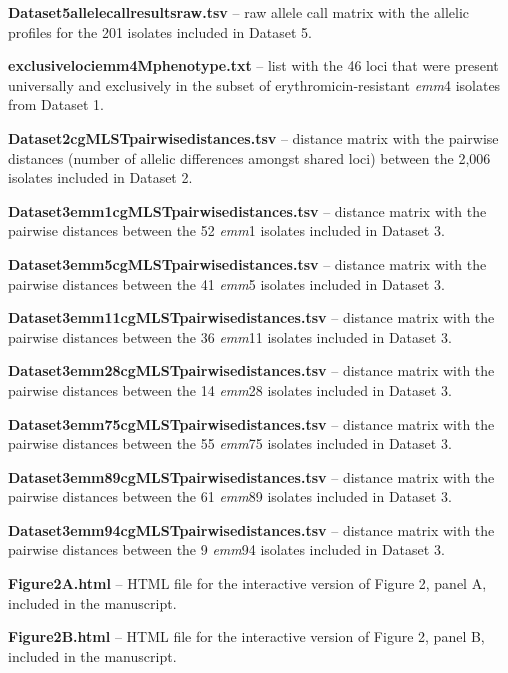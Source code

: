\noindent \textbf{Dataset5\textunderscore allelecall\textunderscore results\textunderscore raw.tsv} – raw allele call matrix with the allelic profiles for the 201 isolates included in Dataset 5.

\noindent \textbf{exclusive\textunderscore loci\textunderscore emm4\textunderscore Mphenotype.txt} – list with the 46 loci that were present universally and exclusively in the subset of erythromicin-resistant \textit{emm}4 isolates from Dataset 1.

\noindent \textbf{Dataset2\textunderscore cgMLST\textunderscore pairwise\textunderscore distances.tsv} – distance matrix with the pairwise distances (number of allelic differences amongst shared loci) between the 2,006 isolates included in Dataset 2.

\noindent \textbf{Dataset3\textunderscore emm1\textunderscore cgMLST\textunderscore pairwise\textunderscore distances.tsv} – distance matrix with the pairwise distances between the 52 \textit{emm}1 isolates included in Dataset 3.

\noindent \textbf{Dataset3\textunderscore emm5\textunderscore cgMLST\textunderscore pairwise\textunderscore distances.tsv} – distance matrix with the pairwise distances between the 41 \textit{emm}5 isolates included in Dataset 3.

\noindent \textbf{Dataset3\textunderscore emm11\textunderscore cgMLST\textunderscore pairwise\textunderscore distances.tsv} – distance matrix with the pairwise distances between the 36 \textit{emm}11 isolates included in Dataset 3.

\noindent \textbf{Dataset3\textunderscore emm28\textunderscore cgMLST\textunderscore pairwise\textunderscore distances.tsv} – distance matrix with the pairwise distances between the 14 \textit{emm}28 isolates included in Dataset 3.

\noindent \textbf{Dataset3\textunderscore emm75\textunderscore cgMLST\textunderscore pairwise\textunderscore distances.tsv} – distance matrix with the pairwise distances between the 55 \textit{emm}75 isolates included in Dataset 3.

\noindent \textbf{Dataset3\textunderscore emm89\textunderscore cgMLST\textunderscore pairwise\textunderscore distances.tsv} – distance matrix with the pairwise distances between the 61 \textit{emm}89 isolates included in Dataset 3.

\noindent \textbf{Dataset3\textunderscore emm94\textunderscore cgMLST\textunderscore pairwise\textunderscore distances.tsv} – distance matrix with the pairwise distances between the 9 \textit{emm}94 isolates included in Dataset 3.

\noindent \textbf{Figure2A.html} – HTML file for the interactive version of Figure 2, panel A, included in the manuscript.

\noindent \textbf{Figure2B.html} – HTML file for the interactive version of Figure 2, panel B, included in the manuscript.
